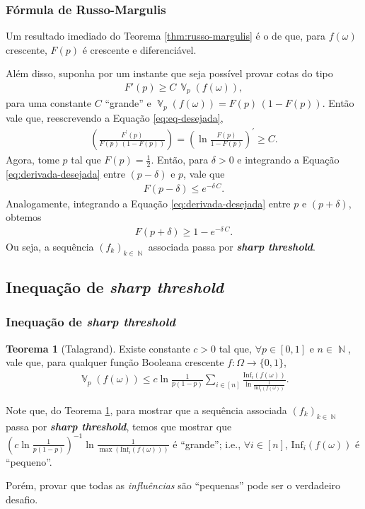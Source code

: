 \documentclass[9pt]{beamer}
\theoremstyle{definition} %
\newtheorem{mythm}{Teorema}
\DeclareMathOperator{\VX}{\mathbb{V}} %
\DeclareMathOperator{\NX}{\mathbb{N}} %
\newcommand{\infl}{\text{Inf}_i(f(\omega))}
\begin{document}
	\begin{frame}[t]
		\frametitle{Fórmula de Russo-Margulis}	
		Um resultado imediado do Teorema \ref{thm:russo-margulis} é o de que, para $f(\omega)$ crescente, $F(p)$ é crescente e diferenciável.
		
		Além disso, suponha por um instante que seja possível provar cotas do tipo
		\begin{align}\label{eq:eq-desejada}
		F'(p) \geq C \, \VX_p(f(\omega)),
		\end{align}
		para uma constante $C$ ``grande'' e $\VX_p(f(\omega)) = F(p) \, (1 - F(p))$. Então vale que, reescrevendo a Equação \ref{eq:eq-desejada},
		\begin{align}\label{eq:derivada-desejada}
		\left(\frac{F^{\prime}(p)}{F(p) \, (1 - F(p))}\right) = \left(\ln \frac{F(p)}{1 - F(p)}\right)^{\prime} \geq C.
		\end{align}
		\pause
		Agora, tome $p$ tal que $F(p) = \frac{1}{2}$. Então, para $\delta > 0$ e integrando a Equação \ref{eq:derivada-desejada} entre $(p - \delta)$ e $p$, vale que
		\begin{align*}
			F(p - \delta) \leq e^{-\delta \, C} .
		\end{align*}
		Analogamente, integrando a Equação \ref{eq:derivada-desejada} entre $p$ e $(p + \delta)$, obtemos
		\begin{align*}
			F(p + \delta) \geq 1 - e^{-\delta \, C}.
		\end{align*}
		Ou seja, a sequência $(f_k)_{k \in \NX}$ associada passa por \textit{\textbf{sharp threshold}}.
	\end{frame}

	\subsection{Inequação de \textit{\textbf{sharp threshold}}}
	\begin{frame}[t]
		\frametitle{Inequação de \textit{\textbf{sharp threshold}}}
		\begin{mythm}[Talagrand]\label{thm:talagrand}
			Existe constante $c > 0$ tal que, $\forall p \in [0,1]$ e $n \in \NX$, vale que, para qualquer função Booleana crescente $f: \Omega \to \{0,1\}$,
			\begin{align*}
			\VX_p(f(\omega)) \leq c \ln\frac{1}{p(1-p)} \sum_{i \in [n]} \frac{\infl}{\ln\frac{1}{\infl}}.
			\end{align*}
			\label{talagrand}
		\end{mythm}
		\vspace{-5pt}
		\pause
		Note que, do Teorema \ref{thm:talagrand}, para mostrar que a sequência associada $(f_k)_{k\in\NX}$ passa por \textit{\textbf{sharp threshold}}, temos que mostrar que $\left(c \ln\frac{1}{p(1-p)}\right)^{-1}\ln\frac{1}{\max(\infl)}$ é ``grande''; i.e., $\forall i \in [n]$, $\infl$ é ``pequeno''.
		
		Porém, provar que todas as \textit{influências} são ``pequenas'' pode ser o verdadeiro desafio.
	\end{frame}
	
\end{document}
